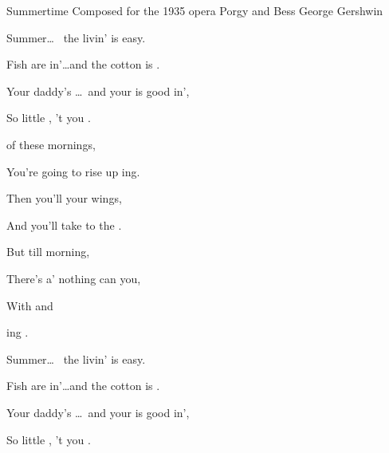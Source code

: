 \begin{SBSong}{Summertime}
  {Composed for the 1935 opera Porgy and Bess}
  {George Gershwin}
  \begin{SBVerse}
    Summer\ldots\  the livin' is  easy.
    
    Fish are in'\ldots and the cotton is .
    
    Your daddy's \ldots\ and your  is good in',
    
    So  little , 't you .
  \end{SBVerse}
  \begin{SBChorus}
     of these mornings, 
    
    You're going to rise up ing.
    
    Then you'll  your wings,
    
    And you'll take to the .
    
    But till  morning, 
    
    There's a' nothing can  you,
    
    With  and 
    
    ing .
  \end{SBChorus}
  
  \begin{SBVerse}
    Summer\ldots\  the livin' is  easy.
    
    Fish are in'\ldots and the cotton is .
    
    Your daddy's \ldots\ and your  is good in',
    
    So  little , 't you .
  \end{SBVerse}
\end{SBSong}
